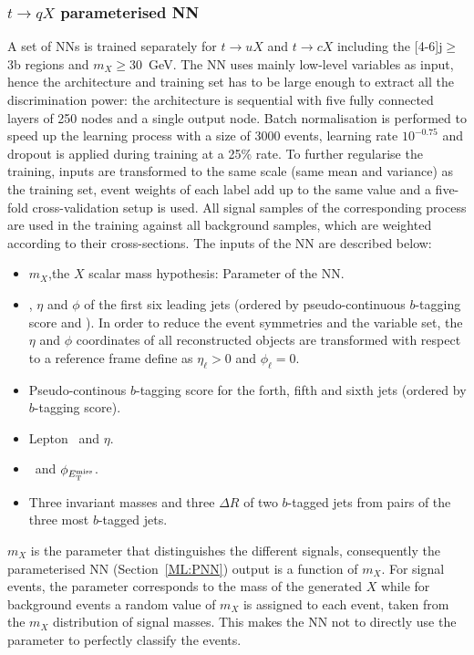 \subsubsection{$t\to qX$ parameterised NN}

A set of NNs is trained separately for $t\to uX$ and $t\to cX$ including the [4-6]j$\geq$3b regions and $m_X\geq$30~GeV. The NN uses mainly low-level variables as input, hence the architecture and training set has to be large enough to extract all the discrimination power: the architecture is sequential with five fully connected layers of 250 nodes and a single output node. Batch normalisation is performed to speed up the learning process with a size of 3000 events, learning rate $10^{-0.75}$ and dropout is applied during training at a 25\% rate. To further regularise the training, inputs are transformed to the same scale (same mean and variance) as the training set, event weights of each label add up to the same value and a five-fold cross-validation setup is used. All signal samples of the corresponding process are used in the training against all background samples, which are weighted according to their cross-sections. The inputs of the NN are described below:

\begin{itemize}
    \item $m_X$,the $X$ scalar mass hypothesis: Parameter of the NN.
    \item \pT, $\eta$ and $\phi$ of the first six leading jets (ordered by pseudo-continuous $b$-tagging score and \pT). In order to reduce the event symmetries and the variable set, the $\eta$ and $\phi$ coordinates of all reconstructed objects are transformed with respect to a reference frame define as $\eta_{\ell}>0$ and $\phi_{\ell}=0$.
    \item Pseudo-continous $b$-tagging score for the forth, fifth and sixth jets (ordered by $b$-tagging score).
    \item Lepton \pT\ and $\eta$.
    \item \MET\ and $\phi_{E_{\text{T}}^{\text{miss}}}$.
    \item Three invariant masses and three $\Delta R$ of two $b$-tagged jets from pairs of the three most $b$-tagged jets. 
\end{itemize}

$m_X$ is the parameter that distinguishes the different signals, consequently the parameterised NN (Section~\ref{ML:PNN}) output is a function of $m_X$. For signal events, the parameter corresponds to the mass of the generated $X$ while for background events a random value of $m_X$ is assigned to each event, taken from the $m_X$ distribution of signal masses. This makes the NN not to directly use the parameter to perfectly classify the events.


